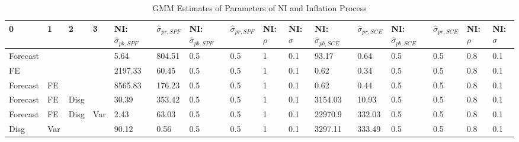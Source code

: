 \documentclass[]{article}
\begin{document}
\begin{table}
	\centering
	\caption{GMM Estimates of Parameters of NI and Inflation Process}
	\label{GMM_Est_NI_Table}
\begin{tabular}{llllllllllllllll}
	\hline 
	0        & 1   & 2    & 3   & NI: $\hat\sigma_{pb,SPF}$ & $\hat\sigma_{pr,SPF}$ & NI: $\hat\sigma_{pb,SPF}$ & $\hat\sigma_{pr,SPF}$ & NI: $\rho$ & NI: $\sigma$ & NI: $\hat\sigma_{pb,SCE}$ & $\hat\sigma_{pr,SCE}$ & NI: $\hat\sigma_{pb,SCE}$ & $\hat\sigma_{pr,SCE}$ & NI: $\rho$ & NI: $\sigma$ \\
	\hline 
	Forecast &     &      &     & 5.64                      & 804.51                & 0.5                       & 0.5                   & 1          & 0.1          & 93.17                     & 0.64                  & 0.5                       & 0.5                   & 0.8        & 0.1          \\
	FE       &     &      &     & 2197.33                   & 60.45                 & 0.5                       & 0.5                   & 1          & 0.1          & 0.62                      & 0.34                  & 0.5                       & 0.5                   & 0.8        & 0.1          \\
	Forecast & FE  &      &     & 8565.83                   & 176.23                & 0.5                       & 0.5                   & 1          & 0.1          & 0.62                      & 0.44                  & 0.5                       & 0.5                   & 0.8        & 0.1          \\
	Forecast & FE  & Disg &     & 30.39                     & 353.42                & 0.5                       & 0.5                   & 1          & 0.1          & 3154.03                   & 10.93                 & 0.5                       & 0.5                   & 0.8        & 0.1          \\
	Forecast & FE  & Disg & Var & 2.43                      & 63.03                 & 0.5                       & 0.5                   & 1          & 0.1          & 22970.9                   & 332.03                & 0.5                       & 0.5                   & 0.8        & 0.1          \\
	Disg     & Var &      &     & 90.12                     & 0.56                  & 0.5                       & 0.5                   & 1          & 0.1          & 3297.11                   & 333.49                & 0.5                       & 0.5                   & 0.8        & 0.1       \\
	\hline   
\end{tabular}
\end{table}
\end{document}
